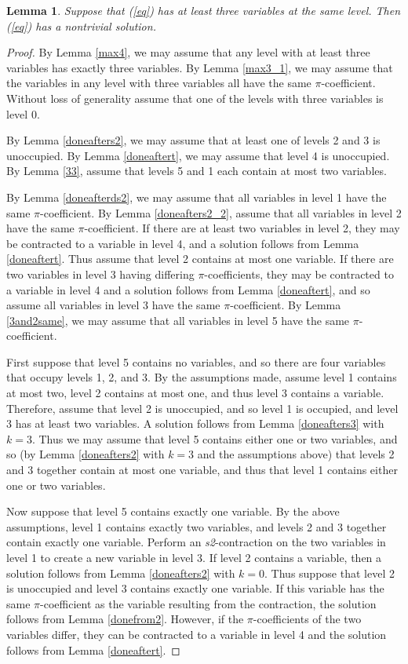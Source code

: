 \documentclass[draft]{publmathdeb}
\newtheorem{lemma}{Lemma}
\begin{document}
\begin{lemma}\label{max3}
Suppose that (\ref{eq}) has at least three variables at the same level.  Then (\ref{eq}) has a nontrivial solution.
\end{lemma}
\begin{proof}
By Lemma \ref{max4}, we may assume that any level with at least three variables has exactly three variables.  By Lemma \ref{max3_1}, we may assume that the variables in any level with three variables all have the same $\pi$-coefficient.   Without loss of generality assume that one of the levels with three variables is level 0.

By Lemma \ref{doneafters2}, we may assume that at least one of levels 2 and 3 is unoccupied.  By Lemma \ref{doneaftert}, we may assume that level 4 is unoccupied. By Lemma \ref{33}, assume that levels 5 and 1 each contain at most two variables.

By Lemma \ref{doneafterds2}, we may assume that all variables in level 1 have the same $\pi$-coefficient.  By Lemma \ref{doneafters2_2},  assume that all variables in level 2 have the same $\pi$-coefficient.  If there are at least two variables in level 2, they may be contracted to a variable in level 4, and a solution follows from Lemma \ref{doneaftert}.  Thus assume that level 2 contains at most one variable.  If there are two variables in level 3 having differing $\pi$-coefficients, they may be contracted to a variable in level 4 and a solution follows from Lemma \ref{doneaftert}, and so assume all variables in level 3 have the same $\pi$-coefficient.  By Lemma \ref{3and2same}, we may assume that all variables in level 5 have the same $\pi$-coefficient.

First suppose that level 5 contains no variables, and so there are four variables that occupy levels 1, 2, and 3.  By the assumptions made, assume level 1 contains at most two, level 2 contains at most one, and thus level 3 contains a variable.  Therefore, assume that level 2 is unoccupied, and so level 1 is occupied, and level 3 has at least two variables.  A solution follows from Lemma \ref{doneafters3} with $k=3$.  Thus we may assume that level 5 contains either one or two variables, and so (by Lemma \ref{doneafters2} with $k=3$ and the assumptions above) that levels 2 and 3 together contain at most one variable, and thus that level 1 contains either one or two variables.

Now suppose that level 5 contains exactly one variable.  By the above assumptions, level 1 contains exactly two variables, and levels 2 and 3 together contain exactly one variable.  Perform an \textit{s2}-contraction on the two variables in level 1 to create a new variable in level 3.  If level 2 contains a variable, then a solution follows from Lemma \ref{doneafters2} with $k=0$.  Thus suppose that level 2 is unoccupied and level 3 contains exactly one variable.  If this variable has the same $\pi$-coefficient as the variable resulting from the contraction, the solution follows from Lemma \ref{donefrom2}.  However, if the $\pi$-coefficients of the two variables differ, they can be contracted to a variable in level 4 and the solution follows from Lemma \ref{doneaftert}.


\end{proof}
\end{document}
